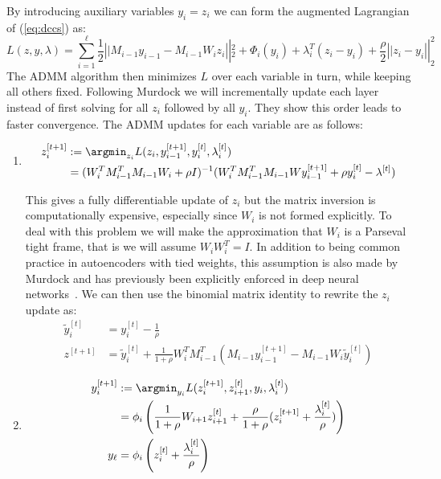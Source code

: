 By introducing auxiliary variables $y_i = z_i$ we can form the augmented Lagrangian of (\ref{eq:dccs}) as:
\begin{equation}
  L(z, y, \lambda) = \sum_{i=1}^{\ell} \frac{1}{2} \left|| M_{i-1}y_{i-1} - M_{i-1}W_iz_i\right||_2^2 + \Phi_i(y_i) + \lambda^T_i(z_i - y_i) + \frac{\rho}{2}\left||z_i - y_i\right||_2^2
\end{equation}
The ADMM algorithm then minimizes $L$ over each variable in turn, while keeping all others fixed. Following Murdock \etal we will incrementally update each layer instead of first solving for all $z_i$ followed by all $y_i$. They show this order leads to faster convergence. The ADMM updates for each variable are as follows:
\begin{enumerate}
\item
  \begin{equation}
    \begin{aligned}
      z^{[t+1]}_i &:= \argmin_{z_i} L(z_i, y^{[t+1]}_{i-1}, y^{[t]}_i, \lambda_i^{[t]})\\
      &= (W_i^TM_{i-1}^TM_{i-1}W_i + \rho I)^{-1}(W_{i}^TM_{i-1}^TM_{i-1}Wy^{[t+1]}_{i-1} + \rho y^{[t]}_{i} - \lambda^{[t]})
    \end{aligned}
    \label{eq:wupdate1}  
  \end{equation}

  This gives a fully differentiable update of $z_i$ but the matrix inversion is computationally expensive, especially since $W_i$ is not formed explicitly. To deal with this problem we will make the approximation that $W_i$ is a Parseval tight frame, that is we will assume $W_iW_i^T = I$. In addition to being common practice in autoencoders with tied weights, this assumption is also made by Murdock \etal and has previously been explicitly enforced in deep neural networks~\cite{}. We can then use the binomial matrix identity to rewrite the $z_i$ update as:
  \begin{equation}
    \begin{aligned}
      \tilde{y}_i^{[t]} &= y_i^{[t]} - \frac{1}{\rho}\\
      z^{[t+1]} &= \tilde{y}_i^{[t]} + \frac{1}{1 + \rho}W^T_iM_{i-1}^T(M_{i-1}y^{[t+1]}_{i-1} - M_{i-1}W_i\tilde{y}^{[t]}_i)
    \end{aligned}\label{eq:zupdate}
  \end{equation}
\item
  \begin{equation}
    \begin{aligned}
      y_i^{[t+1]} &:= \argmin_{y_i} L(z^{[t+1]}_i, z^{[t]}_{i+1}, y_i, \lambda_i^{[t]})\\
      &= \phi_i\left(\frac{1}{1+\rho}W_{i+1}z^{[t]}_{i+1} + \frac{\rho}{1+\rho}(z^{[t+1]}_i + \frac{\lambda_i^{[t]}}{\rho})\right)\\
      y_{\ell} &= \phi_i\left(z_i^{[t]} + \frac{\lambda_i^{[t]}}{\rho}\right)
    \end{aligned}\label{eq:yupdate}
  \end{equation}


\end{enumerate}

